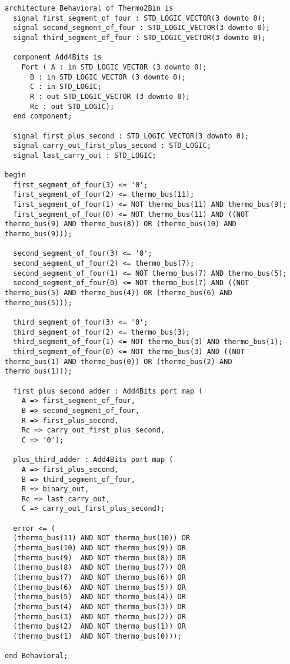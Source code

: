\begin{verbatim}
architecture Behavioral of Thermo2Bin is
  signal first_segment_of_four : STD_LOGIC_VECTOR(3 downto 0);
  signal second_segment_of_four : STD_LOGIC_VECTOR(3 downto 0);
  signal third_segment_of_four : STD_LOGIC_VECTOR(3 downto 0);

  component Add4Bits is
    Port ( A : in STD_LOGIC_VECTOR (3 downto 0);
      B : in STD_LOGIC_VECTOR (3 downto 0);
      C : in STD_LOGIC;
      R : out STD_LOGIC_VECTOR (3 downto 0);
      Rc : out STD_LOGIC);
  end component;

  signal first_plus_second : STD_LOGIC_VECTOR(3 downto 0);
  signal carry_out_first_plus_second : STD_LOGIC;
  signal last_carry_out : STD_LOGIC;

begin
  first_segment_of_four(3) <= '0';
  first_segment_of_four(2) <= thermo_bus(11);
  first_segment_of_four(1) <= NOT thermo_bus(11) AND thermo_bus(9);
  first_segment_of_four(0) <= NOT thermo_bus(11) AND ((NOT thermo_bus(9) AND thermo_bus(8)) OR (thermo_bus(10) AND thermo_bus(9)));

  second_segment_of_four(3) <= '0';
  second_segment_of_four(2) <= thermo_bus(7);
  second_segment_of_four(1) <= NOT thermo_bus(7) AND thermo_bus(5);
  second_segment_of_four(0) <= NOT thermo_bus(7) AND ((NOT thermo_bus(5) AND thermo_bus(4)) OR (thermo_bus(6) AND thermo_bus(5)));

  third_segment_of_four(3) <= '0';
  third_segment_of_four(2) <= thermo_bus(3);
  third_segment_of_four(1) <= NOT thermo_bus(3) AND thermo_bus(1);
  third_segment_of_four(0) <= NOT thermo_bus(3) AND ((NOT thermo_bus(1) AND thermo_bus(0)) OR (thermo_bus(2) AND thermo_bus(1)));

  first_plus_second_adder : Add4Bits port map (
    A => first_segment_of_four,
    B => second_segment_of_four,
    R => first_plus_second,
    Rc => carry_out_first_plus_second,
    C => '0');

  plus_third_adder : Add4Bits port map (
    A => first_plus_second,
    B => third_segment_of_four,
    R => binary_out,
    Rc => last_carry_out,
    C => carry_out_first_plus_second);

  error <= (
  (thermo_bus(11) AND NOT thermo_bus(10)) OR
  (thermo_bus(10) AND NOT thermo_bus(9)) OR
  (thermo_bus(9)  AND NOT thermo_bus(8)) OR
  (thermo_bus(8)  AND NOT thermo_bus(7)) OR
  (thermo_bus(7)  AND NOT thermo_bus(6)) OR
  (thermo_bus(6)  AND NOT thermo_bus(5)) OR
  (thermo_bus(5)  AND NOT thermo_bus(4)) OR
  (thermo_bus(4)  AND NOT thermo_bus(3)) OR
  (thermo_bus(3)  AND NOT thermo_bus(2)) OR
  (thermo_bus(2)  AND NOT thermo_bus(1)) OR
  (thermo_bus(1)  AND NOT thermo_bus(0)));

end Behavioral;
\end{verbatim}
